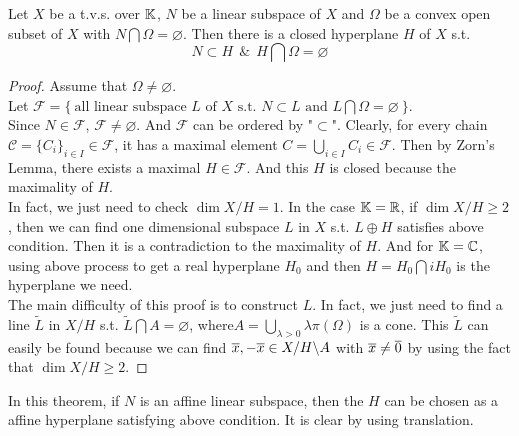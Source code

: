 \documentclass[a4paper,11pt]{report}
\begin{document}
\begin{thm}
	Let $X$ be a t.v.s. over $\mathbb{K}$, $N$ be a linear subspace of $X$ and $\Omega$ be a convex open subset of $X$ with $N \bigcap \Omega = \varnothing$. Then there is a closed hyperplane $H$ of $X$ s.t.
	\begin{equation*}
		N \subset H ~~\&~~ H \bigcap \Omega = \varnothing
	\end{equation*}
\end{thm}
\begin{proof}
	Assume that $\Omega \neq \varnothing$.\\
    Let $\mathscr{F} = \{~ \text{all linear subspace } L \text{ of } X \text{ s.t. } N \subset L \text{ and } L \bigcap \Omega = \varnothing ~\}$. \\
	Since $N \in \mathscr{F}$, $\mathscr{F} \neq \varnothing$. And $\mathscr{F}$ can be ordered by "$\subset$". Clearly, for every chain $\mathscr{C} = \{C_i\}_{i \in I} \in \mathscr{F}$, it has a maximal element $C = \bigcup_{i \in I} C_i \in \mathscr{F}$. Then by Zorn's Lemma, there exists a maximal $H \in \mathscr{F}$. And this $H$ is closed because the maximality of $H$.\\
	In fact, we just need to check $\dim{X/H} = 1$. In the case $\mathbb{K} = \mathbb{R}$, if $\dim{X/H} \geqslant 2$, then we can find one dimensional subspace $L$ in $X$ s.t. $L \oplus H$ satisfies above condition. Then it is a contradiction to the maximality of $H$. And for $\mathbb{K} = \mathbb{C}$, using above process to get a real hyperplane $H_0$ and then $H = H_0 \bigcap iH_0$ is the hyperplane we need.\\
	The main difficulty of this proof is to construct $L$. In fact, we just need to find a line $\tilde{L}$ in $X/H$ s.t. $\tilde{L} \bigcap A = \varnothing$, where$A = \bigcup_{\lambda > 0} \lambda \pi(\Omega)$ is a cone. This $\tilde{L}$ can easily be found because we can find $\overline{x}, -\overline{x} \in X/H \backslash A$ with $\overline{x} \neq \overline{0}$ by using the fact that $\dim{X/H} \geqslant 2$.
\end{proof}
\begin{rem}
	In this theorem, if $N$ is an affine linear subspace, then the $H$ can be chosen as a affine hyperplane satisfying above condition. It is clear by using translation.
\end{rem}
\end{document}
